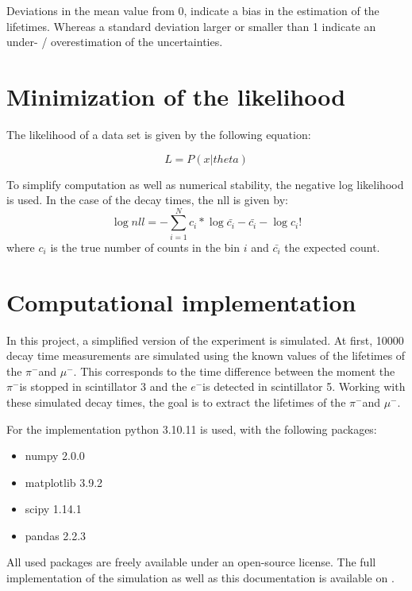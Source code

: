 \documentclass[11pt, a4paper, oneside]{book}
\newcommand{\electron}{$e^{-}$}
\newcommand{\pion}{$\pi^{-}$}
\newcommand{\muon}{$\mu^{-}$}
\begin{document}
Deviations in the mean value from 0, indicate a bias in the estimation of the lifetimes. Whereas a standard deviation larger or smaller than 1 indicate an under- / overestimation of the uncertainties. 

\section{Minimization of the likelihood}
The likelihood of a data set is given by the following equation:

\begin{equation}
    L = P(x | theta)
    \label{eq:likelihood_base}
\end{equation}

To simplify computation as well as numerical stability, the negative log likelihood is used. In the case of the decay times, the nll is given by:
\begin{equation}
  \log{nll} = -\sum_{i=1}^{N} c_i * \log{\bar{c_i}} - \bar{c_i} - \log{c_i!}
  \label{eq:likelihood}
\end{equation}
where $c_i$ is the true number of counts in the bin $i$ and $\bar{c_i}$ the expected count.

\section{Computational implementation}
In this project, a simplified version of the experiment is simulated. At first, \num{10000} decay time measurements are simulated using the known values of the lifetimes of the \pion and \muon. This corresponds to the time difference between the moment the \pion is stopped in scintillator 3 and the \electron is detected in scintillator 5. Working with these simulated decay times, the goal is to extract the lifetimes of the \pion and \muon.

For the implementation python 3.10.11 is used, with the following packages:
\begin{itemize}
    \item numpy 2.0.0
    \item matplotlib 3.9.2
    \item scipy 1.14.1
    \item pandas 2.2.3
\end{itemize}
All used packages are freely available under an open-source license. 
The full implementation of the simulation as well as this documentation is available on \cite{GitHub}.

\end{document}

